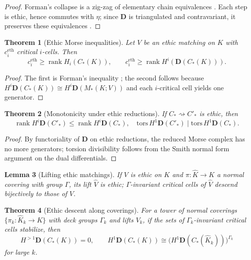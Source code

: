 \documentclass[12pt]{article}
\theoremstyle{plain}
\newtheorem{theorem}{Theorem}[section]
\newtheorem{lemma}[theorem]{Lemma}
\theoremstyle{definition}
\theoremstyle{remark}
\numberwithin{equation}{section}
\begin{document}
\begin{proof}
Forman's collapse is a zig-zag of elementary chain equivalences \cite{Forman1998}. Each step is ethic, hence commutes with \(\eta\); since \(\mathbf D\) is triangulated and contravariant, it preserves these equivalences \cite{GelfandManin2003}.
\end{proof}

\begin{theorem}[Ethic Morse inequalities]
Let \(V\) be an ethic matching on \(K\) with \(c_i^{\mathrm{eth}}\) critical \(i\)-cells. Then
\[
c_i^{\mathrm{eth}}\ge \operatorname{rank} H_i(C_\ast(K)),\qquad
c_i^{\mathrm{eth}}\ge \operatorname{rank} H^i(\mathbf D(C_\ast(K))).
\]
\end{theorem}

\begin{proof}
The first is Forman's inequality \cite{Forman1998}; the second follows because \(H^i\mathbf D(C_\ast(K))\cong H^i\mathbf D(M_\ast(K;V))\) and each \(i\)-critical cell yields one generator.
\end{proof}

\begin{theorem}[Monotonicity under ethic reductions]
If \(C_\ast \rightsquigarrow C'_\ast\) is ethic, then
\[
\operatorname{rank} H^i\mathbf D(C'_\ast)\le \operatorname{rank} H^i\mathbf D(C_\ast),
\quad
\mathrm{tors}\,H^1\mathbf D(C'_\ast)\mid \mathrm{tors}\,H^1\mathbf D(C_\ast).
\]
\end{theorem}

\begin{proof}
By functoriality of \(\mathbf D\) on ethic reductions, the reduced Morse complex has no more generators; torsion divisibility follows from the Smith normal form argument on the dual differentials.
\end{proof}

\begin{lemma}[Lifting ethic matchings]
If \(V\) is ethic on \(K\) and \(\pi:\hat K\to K\) a normal covering with group \(\Gamma\), its lift \(\hat V\) is ethic; \(\Gamma\)-invariant critical cells of \(\hat V\) descend bijectively to those of \(V\).
\end{lemma}

\begin{theorem}[Ethic descent along coverings]
For a tower of normal coverings \(\{\pi_k:\hat K_k\to K\}\) with deck groups \(\Gamma_k\) and lifts \(V_k\),
if the sets of \(\Gamma_k\)-invariant critical cells stabilize, then
\[
H^{>1}\mathbf D(C_\ast(K))=0,\qquad
H^{1}\mathbf D(C_\ast(K))\cong \big(H^{1}\mathbf D(C_\ast(\hat K_k))\big)^{\Gamma_k}
\]
for large \(k\).
\end{theorem}
\end{document}
